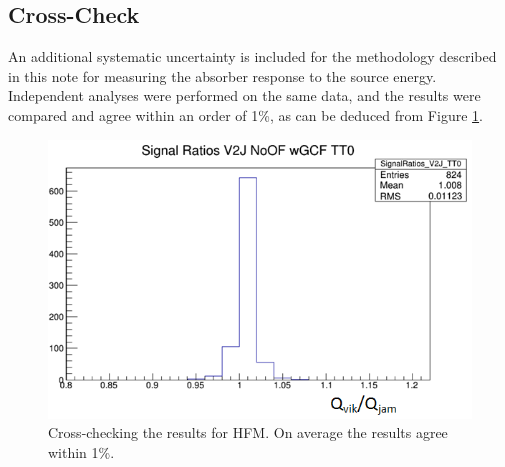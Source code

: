\subsection{Cross-Check}
An additional systematic uncertainty is included for the
methodology described in this note for measuring the absorber response to the source energy. Independent analyses were performed on the same data, and the results were compared and agree within an order of 1\%, as can be deduced from Figure \ref{fig:Crosscheck}.
\begin{figure}[htb]
    \begin{center}
        \includegraphics[width=.5\textwidth]{figures/ch_hfcalibration/Crosscheck.png}
        \caption{Cross-checking the results for HFM. On average the results agree within 1\%.}
        \label{fig:Crosscheck}
    \end{center}
\end{figure}